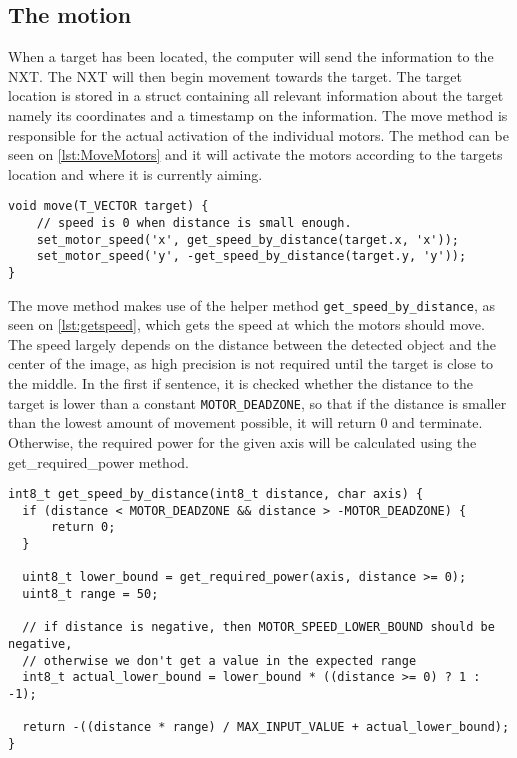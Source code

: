 \subsection{The motion}
When a target has been located, the computer will send the information to the NXT.
The NXT will then begin movement towards the target.
The target location is stored in a struct containing all relevant information about the target namely its coordinates and a timestamp on the information.
The move method is responsible for the actual activation of the individual motors.
The method can be seen on \autoref{lst:MoveMotors} and it will activate the motors according to the targets location and where it is currently aiming.
\begin{lstlisting}[language=CSharp,caption={move method from movement.c},label={lst:MoveMotors}]
  void move(T_VECTOR target) {
    // speed is 0 when distance is small enough.
    set_motor_speed('x', get_speed_by_distance(target.x, 'x'));
    set_motor_speed('y', -get_speed_by_distance(target.y, 'y'));
}
\end{lstlisting}

The move method makes use of the helper method \texttt{get\_speed\_by\_distance}, as seen on \autoref{lst:getspeed}, which gets the speed at which the motors should move.
The speed largely depends on the distance between the detected object and the center of the image, as high precision is not required until the target is close to the middle.
In the first if sentence, it is checked whether the distance to the target is lower than a constant \texttt{MOTOR\_DEADZONE}, so that if the distance is smaller than the lowest amount of movement possible, it will return 0 and terminate.
Otherwise, the required power for the given axis will be calculated using the get\_required\_power method.

\begin{lstlisting}[language=CSharp,caption={get\_speed\_by\_distance method from movement.c},label={lst:getspeed}]
int8_t get_speed_by_distance(int8_t distance, char axis) {
  if (distance < MOTOR_DEADZONE && distance > -MOTOR_DEADZONE) {
      return 0;
  }

  uint8_t lower_bound = get_required_power(axis, distance >= 0);
  uint8_t range = 50;

  // if distance is negative, then MOTOR_SPEED_LOWER_BOUND should be negative,
  // otherwise we don't get a value in the expected range
  int8_t actual_lower_bound = lower_bound * ((distance >= 0) ? 1 : -1);

  return -((distance * range) / MAX_INPUT_VALUE + actual_lower_bound);
}
\end{lstlisting}

